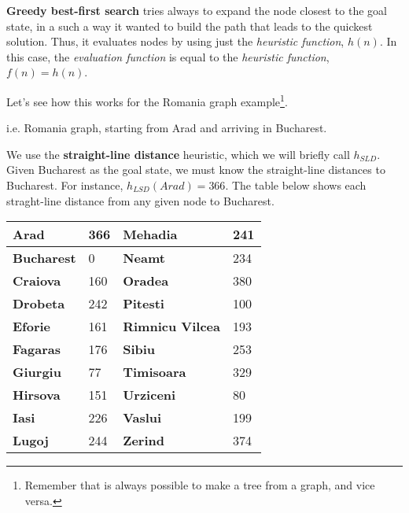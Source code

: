 \textbf{Greedy best-first search} tries always to expand the node closest to the goal state, in a such a way it wanted to build the path that leads to the quickest solution. Thus,
it evaluates nodes by using just the \textit{heuristic function}, $h(n)$. In this case, the \textit{evaluation function} is equal to the \textit{heuristic function}, $f(n) = h(n)$. \vspace{3.5pt}

Let's see how this works for the Romania graph example\footnote{Remember that is always possible to make a tree from a graph, and vice versa.}.
\begin{example}
    i.e. Romania graph, starting from Arad and arriving in Bucharest.
    \begin{center}
    \end{center}
    We use the \textbf{straight-line distance} heuristic, which we will briefly call $h_{SLD}$. Given Bucharest as the goal state, we must know the straight-line 
    distances to Bucharest. For instance,
    $h_{LSD}(Arad) = 366$. The table below shows each straght-line distance from any given node to Bucharest. \vspace{3.5pt}

    \begin{center}
        \begin{tabular}{|l|p{2cm}|l|p{2cm}|}
            \hline
            \bf Arad & 366 & \bf Mehadia & 241 \\
            \hline
            \bf Bucharest & 0 & \bf Neamt & 234 \\
            \hline
            \bf Craiova & 160 & \bf Oradea & 380 \\
            \hline
            \bf Drobeta & 242 & \bf Pitesti & 100 \\
            \hline
            \bf Eforie & 161 & \bf Rimnicu Vilcea & 193 \\
            \hline
            \bf Fagaras & 176 & \bf Sibiu & 253 \\
            \hline
            \bf Giurgiu & 77 & \bf Timisoara & 329 \\
            \hline
            \bf Hirsova & 151 & \bf Urziceni & 80 \\
            \hline
            \bf Iasi & 226 & \bf Vaslui & 199 \\
            \hline
            \bf Lugoj & 244 & \bf Zerind & 374 \\
            \hline
        \end{tabular}
    \end{center} \vspace{3.5pt}


\end{example}
